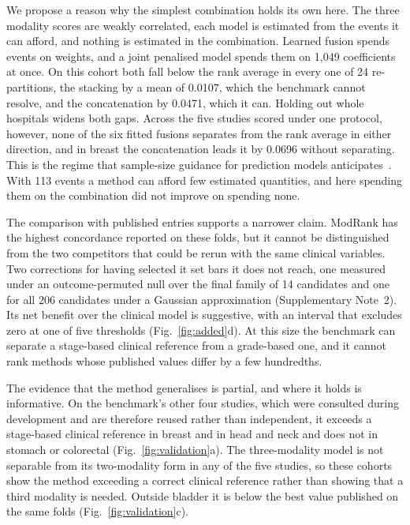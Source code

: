 \documentclass[pdflatex,sn-nature]{sn-jnl}
\begin{document}
We propose a reason why the simplest combination holds its own here. The three modality scores are weakly correlated, each model is estimated from the events it can afford, and
nothing is estimated in the combination. Learned fusion spends events on weights, and a joint
penalised model spends them on 1,049 coefficients at once. On this cohort both fall below the rank
average in every one of 24 re-partitions, the stacking by a mean of 0.0107, which the benchmark
cannot resolve, and the concatenation by 0.0471, which it can. Holding out whole hospitals widens both gaps. Across the five
studies scored under one protocol, however, none of the six fitted fusions separates from the rank
average in either direction, and in breast the concatenation leads it by 0.0696 without separating. This is the
regime that sample-size guidance for prediction models anticipates~\citep{riley2020samplesize}.
With 113 events a method can afford few estimated quantities, and here spending them on the combination did not improve on
spending none.

The comparison with published entries supports a narrower claim. ModRank has the highest
concordance reported on these folds, but it cannot be distinguished from the two competitors that
could be rerun with the same clinical variables. Two corrections for having selected it set bars it does not reach, one measured under an
outcome-permuted null over the final family of 14 candidates and one for all 206 candidates under a
Gaussian approximation (Supplementary Note~2). Its net benefit over the
clinical model is suggestive, with an interval that excludes zero at one of five thresholds
(Fig.~\ref{fig:added}d). At this size the benchmark can separate a
stage-based clinical reference from a grade-based one, and it cannot rank methods whose
published values differ by a few hundredths.

The evidence that the method generalises is partial, and where it holds is informative. On the
benchmark's other four studies, which were consulted during development and are therefore reused
rather than independent, it exceeds a stage-based clinical reference in breast and in head and neck and does not in
stomach or colorectal (Fig.~\ref{fig:validation}a). The three-modality model is not separable from
its two-modality form in any of the five studies, so these cohorts show the method exceeding a correct
clinical reference rather than showing that a third modality is needed. Outside bladder it is below the
best value published on the same folds (Fig.~\ref{fig:validation}c).
\end{document}
